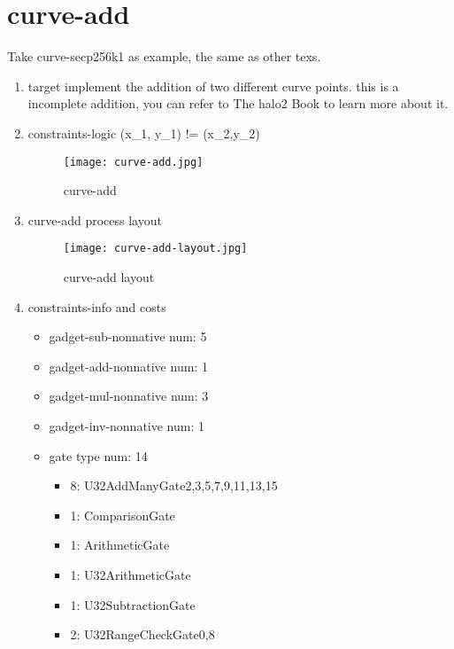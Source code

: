 \section{curve-add}
\label{curve-add}

Take curve-secp256k1 as example, the same as other texs.

\begin{enumerate}
    \item target
        implement the addition of two different curve points. this is a incomplete addition, you can refer to The halo2 Book \cite{website:halo2-book} to learn more about it.
    \item constraints-logic (x\_1, y\_1) != (x\_2,y\_2)
        \begin{figure}[!ht]
            \centering
            \texttt{[image: curve-add.jpg]}
            \caption{curve-add}
            \label{fig:curve-add}
        \end{figure}
    \item curve-add process layout
        \begin{figure}[!ht]
            \centering
            \texttt{[image: curve-add-layout.jpg]}
            \caption{curve-add layout}
            \label{fig:curve-add-layout}
        \end{figure}
    
    \item constraints-info and costs
        \begin{itemize}
            \item gadget-sub-nonnative num: 5
            \item gadget-add-nonnative num: 1
            \item gadget-mul-nonnative num: 3
            \item gadget-inv-nonnative num: 1
            \item gate type num: 14
                \begin{itemize}
                    \item 8: U32AddManyGate{2,3,5,7,9,11,13,15}
                    \item 1: ComparisonGate
                    \item 1: ArithmeticGate
                    \item 1: U32ArithmeticGate
                    \item 1: U32SubtractionGate
                    \item 2: U32RangeCheckGate{0,8}
                \end{itemize}
        \end{itemize}

\end{enumerate}